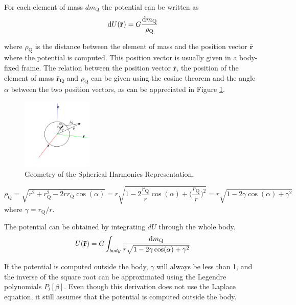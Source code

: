 \documentclass[]{AVSSimReportMemo}
\begin{document}
For each element of mass $d m_\text{Q}$ the potential can be written as
\begin{equation}
\textrm{d} U(\mathbf{\bar r}) = G \frac{\textrm{d} m_\text{Q}}{\rho_\text{Q}}
\end{equation}

where $\rho_\text{Q}$ is the distance between the element of mass and the position vector $\mathbf{\bar r}$ where the potential is computed. This position vector is usually given in a body-fixed frame. The relation between the position vector $\mathbf{\bar r}$, the position of the element of mass $\mathbf{\bar r_\text{Q}}$ and $\rho_\text{Q}$ can be given using the cosine theorem and the angle $\alpha$ between the two position vectors, as can be appreciated in Figure \ref{fig:spher_harm}.

\begin{figure}
\centering
\includegraphics[width=0.3\textwidth]{Figures/spherical_harmonics.png}
\caption{Geometry of the Spherical Harmonics Representation.}\label{fig:spher_harm}
\end{figure}

\begin{equation}
\rho_\text{Q} = \sqrt{r^2 + r_\text{Q}^2 - 2 r r_\text{Q} \cos(\alpha)} = r \sqrt{1 - 2 \frac{r_\text{Q}}{r} \cos(\alpha) + \bigg(\frac{r_\text{Q}}{r}\bigg)^2} = r \sqrt{1 - 2 \gamma \cos(\alpha) + \gamma^2}
\end{equation}
where $\gamma = r_\text{Q}/r$.

The potential can be obtained by integrating $dU$ through the whole body.
\begin{equation}
U(\mathbf{\bar r}) = G \int_{body} \frac{\textrm{d} m_\text{Q}}{r \sqrt{1 - 2 \gamma \cos(\alpha) + \gamma^2}}
\end{equation}

If the potential is computed outside the body, $\gamma$ will always be less than 1, and the inverse of the square root can be approximated using the Legendre polynomials $P_l[\beta]$\cite{vallado2013}. Even though this derivation does not use the Laplace equation, it still assumes that the potential is computed outside the body.
\end{document}
